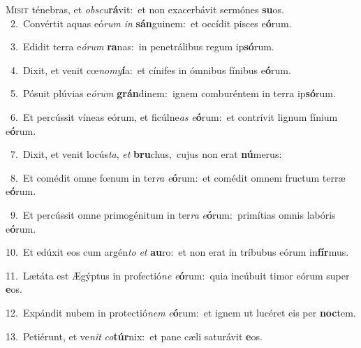 \lettrine{\initial\textcolor{\initialcolor}{M}}{isit} ténebras, et \textit{obs}\-\textit{cu}\textbf{rá}vit:~\star et non exacerbávit sermónes \textbf{su}\-os.\\
{\numbfont\textcolor{\numbcolor}{~2.}}~Convértit aquas eó\textit{rum} \textit{in} \textbf{sán}\-guinem:~\star et occídit pisces e\-\textbf{ó}\-rum.\par
{\numbfont\textcolor{\numbcolor}{~3.}}~Edidit terra e\-\textit{ó}\-\textit{rum} \textbf{ra}\-nas:~\star in penetrálibus regum ip\-\textbf{só}\-rum.\par
{\numbfont\textcolor{\numbcolor}{~4.}}~Dixit, et venit cœ\-\textit{no}\-\textit{my}\textbf{í}a:~\star et cínifes in ómnibus fínibus e\-\textbf{ó}\-rum.\par
{\numbfont\textcolor{\numbcolor}{~5.}}~Pósuit plúvias e\-\textit{ó}\-\textit{rum} \textbf{grán}\-dinem:~\star ignem comburéntem in terra ip\-\textbf{só}\-rum.\par
{\numbfont\textcolor{\numbcolor}{~6.}}~Et percússit víneas eórum, et ficúlne\textit{as} \textit{e}\-\textbf{ó}rum:~\star et contrívit lignum fínium e\-\textbf{ó}\-rum.\par
{\numbfont\textcolor{\numbcolor}{~7.}}~Dixit, et venit locús\-\textit{ta}\-, \textit{et} \textbf{bru}\-chus,~\star cujus non erat \textbf{nú}\-merus:\par
{\numbfont\textcolor{\numbcolor}{~8.}}~Et comédit omne fœnum in ter\textit{ra} \textit{e}\-\textbf{ó}rum:~\star et comédit omnem fructum terræ e\-\textbf{ó}\-rum.\par
{\numbfont\textcolor{\numbcolor}{~9.}}~Et percússit omne primogénitum in ter\textit{ra} \textit{e}\-\textbf{ó}rum:~\star primítias omnis labóris e\-\textbf{ó}\-rum.\par
{\numbfont\textcolor{\numbcolor}{10.}}~Et edúxit eos cum argén\textit{to} \textit{et} \textbf{au}\-ro:~\star et non erat in tríbubus eórum in\-\textbf{fír}\-mus.\par
{\numbfont\textcolor{\numbcolor}{11.}}~Lætáta est Ægýptus in profectió\textit{ne} \textit{e}\-\textbf{ó}rum:~\star quia incúbuit timor eórum super \textbf{e}\-os.\par
{\numbfont\textcolor{\numbcolor}{12.}}~Expándit nubem in protectió\textit{nem} \textit{e}\-\textbf{ó}rum:~\star et ignem ut lucéret eis per \textbf{noc}\-tem.\par
{\numbfont\textcolor{\numbcolor}{13.}}~Petiérunt, et ve\textit{nit} \textit{co}\-\textbf{túr}nix:~\star et pane cæli saturávit \textbf{e}\-os.\par
